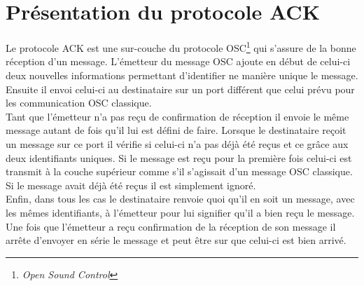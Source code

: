 \section{Présentation du protocole ACK}
Le protocole ACK est une sur-couche du protocole OSC\footnote{\textit{Open Sound Control}}\citep{webpage_TheOpenSoundControl10Specificationopensoundcontrolorg_} qui s'assure de la bonne réception d'un message.\p
L'émetteur du message OSC ajoute en début de celui-ci deux nouvelles informations permettant d'identifier ne manière unique le message. Ensuite il envoi celui-ci au destinataire sur un port différent que celui prévu pour les communication OSC classique.\\
Tant que l'émetteur n'a pas reçu de confirmation de réception il envoie le même message autant de fois qu'il lui est défini de faire.\p
Lorsque le destinataire reçoit un message sur ce port il vérifie si celui-ci n'a pas déjà été reçus et ce grâce aux deux identifiants uniques. Si le message est reçu pour la première fois celui-ci est transmit à la couche supérieur comme s'il s'agissait d'un message OSC classique. Si le message avait déjà été reçus il est simplement ignoré. \\
Enfin, dans tous les cas le destinataire renvoie quoi qu'il en soit un message, avec les mêmes identifiants, à l'émetteur pour lui signifier qu'il a bien reçu le message.\p
Une fois que l'émetteur a reçu confirmation de la réception de son message il arrête d'envoyer en série le message et peut être sur que celui-ci est bien arrivé.

